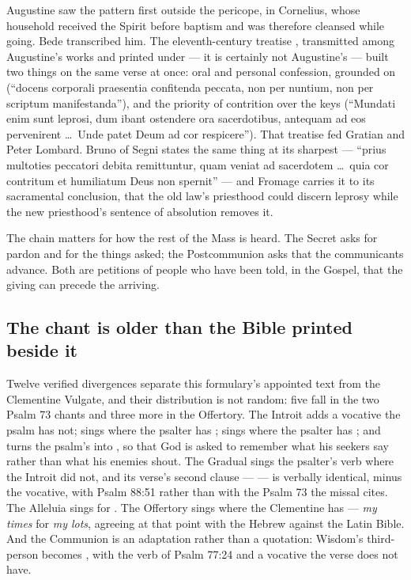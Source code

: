 Augustine saw the pattern first outside the pericope, in Cornelius, whose
household received the Spirit before baptism and was therefore cleansed while
going. Bede transcribed him. The eleventh-century treatise , transmitted among Augustine's works and printed under
 --- it is certainly not Augustine's --- built two
things on the same verse at once: oral and personal confession, grounded on
 (``docens corporali praesentia confitenda
peccata, non per nuntium, non per scriptum manifestanda''), and the priority
of contrition over the keys (``Mundati enim sunt leprosi, dum ibant ostendere
ora sacerdotibus, antequam ad eos pervenirent \dots\ Unde patet Deum ad cor
respicere''). That treatise fed Gratian and Peter Lombard. Bruno of Segni states
the same thing at its sharpest --- ``prius multoties peccatori debita
remittuntur, quam veniat ad sacerdotem \dots\ quia cor contritum et humiliatum
Deus non spernit'' --- and Fromage carries it to its sacramental conclusion,
that the old law's priesthood could discern leprosy while the new priesthood's
sentence of absolution removes it.

The chain matters for how the rest of the Mass is heard. The Secret asks for
pardon and for the things asked; the Postcommunion asks that the communicants
advance. Both are petitions of people who have been told, in the Gospel, that
the giving can precede the arriving.

\subsection*{The chant is older than the Bible printed beside it}

Twelve verified divergences separate this formulary's appointed text from the
Clementine Vulgate, and their distribution is not random: five fall in the two
Psalm 73 chants and three more in the Offertory. The Introit adds a vocative
the psalm has not; sings  where the psalter has
; sings  where the psalter has
; and turns the psalm's 
into , so that God is asked to remember what his
seekers say rather than what his enemies shout. The Gradual sings the psalter's
verb where the Introit did not, and its verse's second clause ---
 --- is verbally identical, minus
the vocative, with Psalm 88:51 rather than with the Psalm 73 the missal cites.
The Alleluia sings  for . The Offertory sings  where the Clementine
has  --- \textit{my times} for \textit{my lots}, agreeing at
that point with the Hebrew against the Latin Bible. And the Communion is an
adaptation rather than a quotation: Wisdom's third-person  becomes , with the verb of Psalm 77:24 and
a vocative the verse does not have.

